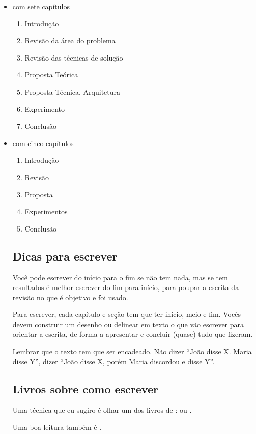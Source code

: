 \documentclass{article}
\begin{document}
\begin{itemize}
    \item com sete capítulos
    \begin{enumerate}
        \item Introdução
        \item Revisão da área do problema
        \item Revisão das técnicas de solução
        \item Proposta Teórica
        \item Proposta Técnica, Arquitetura
        \item Experimento 
        \item Conclusão
    \end{enumerate}
    \item com cinco capítulos
    \begin{enumerate}
        \item Introdução
        \item Revisão
        \item Proposta
        \item Experimentos
        \item Conclusão
    \end{enumerate}

\subsection{Dicas para escrever}
    
Você pode escrever do início para o fim se não tem nada, mas se tem resultados é melhor escrever do fim para início, para poupar a escrita da revisão no que é objetivo e foi usado.

Para escrever, cada capítulo e seção tem que ter início, meio e fim. Vocês devem construir um desenho ou delinear em texto o que vão escrever para orientar a escrita, de forma a apresentar e concluir (quase) tudo que fizeram.


Lembrar que o texto tem que ser encadeado. Não dizer ``João disse X. Maria disse Y'', dizer ``João disse X, porém Maria discordou e disse Y''.
    
\subsection{Livros sobre como escrever}    

Uma técnica que eu sugiro é olhar um dos  livros de \citeauthor{minto1}:  \citep{minto1} ou \citep{minto2}. 

Uma boa leitura também é \citep{wcs}.

    
\end{itemize}
\end{document}
